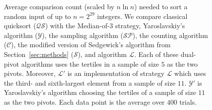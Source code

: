 \documentclass[prodmode,acmtalg]{acmsmall}
\begin{document}
\begin{figure}
    \caption{Average comparison count (scaled by $n \ln n$) needed to sort a random
        input of up to $n = 2^{29}$ integers. We compare classical quicksort
        ($\mathcal{QS}$) with the Median-of-$3$ strategy, Yaroslavskiy's
        algorithm ($\mathcal{Y}$), the sampling algorithm ($\mathcal{SP}$), the
        counting algorithm
        ($\mathcal{C}$), the modified
        version of Sedgewick's algorithm from Section~\ref{sec:methods}
        ($\mathcal{S}$), and algorithm $\mathcal{L}$. Each of these dual-pivot
        algorithms uses the tertiles in a sample of size $5$ as the two pivots.
        Moreover, $\mathcal{L}'$ is an implementation of strategy $\mathcal{L}$
        which uses the third- and sixth-largest element from a sample of size
        $11$. $\mathcal{Y}'$ is Yaroslavskiy's algorithm choosing the tertiles
        of a sample of size $11$ as the two pivots. Each data point is the
        average over $400$ trials. }
    \label{fig:comp:sample}
\end{figure}
\end{document}
